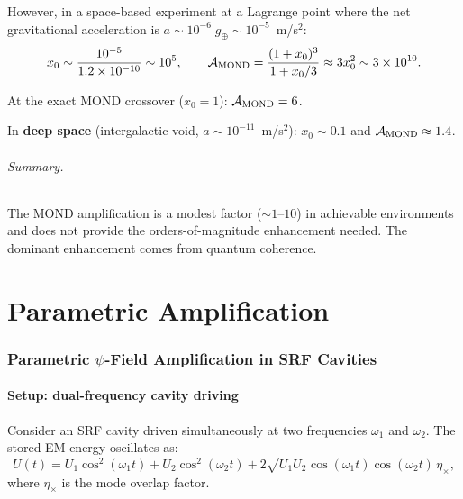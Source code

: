 \documentclass[12pt,aps,prd,twocolumn,superscriptaddress,nofootinbib]{revtex4-2}
\newcommand{\ee}[1]{\times 10^{#1}}
\begin{document}
However, in a space-based experiment at a Lagrange point where the
net gravitational acceleration is $a \sim 10^{-6}\;g_\oplus \sim
10^{-5}$~m/s$^2$:
\begin{equation}
x_0 \sim \frac{10^{-5}}{1.2\ee{-10}} \sim 10^5,\qquad
\mathcal{A}_{\rm MOND} = \frac{(1+x_0)^3}{1+x_0/3} \approx 3x_0^2
\sim 3\ee{10}.
\end{equation}

At the exact MOND crossover ($x_0 = 1$): $\mathcal{A}_{\rm MOND} = 6$.

In \textbf{deep space} (intergalactic void, $a \sim 10^{-11}$~m/s$^2$):
$x_0 \sim 0.1$ and $\mathcal{A}_{\rm MOND} \approx 1.4$.

\paragraph{Summary.} The MOND amplification is a modest factor
($\sim 1$--$10$) in achievable environments and does not provide
the orders-of-magnitude enhancement needed. The dominant enhancement
comes from quantum coherence.


\part{Parametric Amplification}

\section{Parametric $\psi$-Field Amplification in SRF Cavities}
\label{sec:parametric}

\subsection{Setup: dual-frequency cavity driving}

Consider an SRF cavity driven simultaneously at two frequencies
$\omega_1$ and $\omega_2$. The stored EM energy oscillates as:
\begin{equation}\label{eq:U-dual}
U(t) = U_1\cos^2(\omega_1 t) + U_2\cos^2(\omega_2 t)
+ 2\sqrt{U_1 U_2}\cos(\omega_1 t)\cos(\omega_2 t)\,\eta_\times,
\end{equation}
where $\eta_\times$ is the mode overlap factor.
\end{document}
